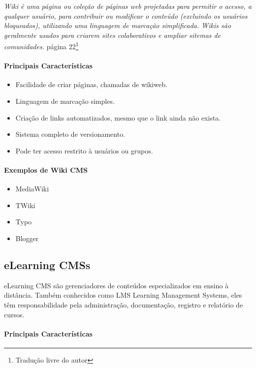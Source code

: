 \emph{Wiki é uma página ou coleção de páginas web projetadas para permitir o acesso, a qualquer usuário, para contribuir ou modificar o conteúdo (excluindo os usuários bloqueados), utilizando uma linguagem de marcação simplificada. Wikis são geralmente usados para criarem sites colaborativos e ampliar sitemas de comunidades.}
\cite{choosing_open_source_cms}{página 22}\footnote{Tradução livre do autor} 


\paragraph{Principais Características}

\begin{itemize}
  \item Facilidade de criar páginas, chamadas de wikiweb.
  \item Linguagem de marcação simples.
  \item Criação de links automatizados, mesmo que o link ainda não exista.
  \item Sistema completo de versionamento.
  \item Pode ter acesso restrito à usuários ou grupos.
\end{itemize}

\paragraph{Exemplos de Wiki CMS} 

\begin{itemize}
  \item MediaWiki
  \item TWiki
  \item Typo
  \item Blogger
\end{itemize}


\subsection{eLearning CMSs} 

eLearning CMS são gerenciadores de conteúdos especializados em ensino à distância. Também conhecidos como LMS Learning Management Systems, eles têm responsabilidade pela administração, documentação, registro e relatório de cursos.
 
\paragraph{Principais Características}

